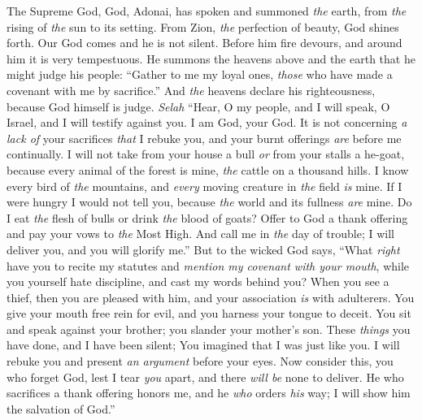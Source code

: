 \begin{biblechapter} %
 The Supreme God, God, Adonai, has spoken 
and summoned \textit{the} earth, 
from \textit{the} rising of \textit{the} sun 
to its setting.
\verse From Zion, \textit{the} perfection of beauty, 
God shines forth.
\verse Our God comes and he is not silent. 
Before him fire devours, 
and around him it is very tempestuous.
\verse He summons the heavens above 
and the earth that he might judge his people:
\verse “Gather to me my loyal ones, 
\textit{those} who have made a covenant with me by sacrifice.”
\verse And \textit{the} heavens declare his righteousness, 
because God himself is judge. \textit{Selah}
\verse “Hear, O my people, and I will speak, 
O Israel, and I will testify against you. 
I am God, your God.
\verse It is not concerning \textit{a lack of} your sacrifices \textit{that} I rebuke you, 
and your burnt offerings \textit{are} before me continually.
\verse I will not take from your house a bull 
\textit{or} from your stalls a he-goat,
\verse because every animal of the forest is mine, 
\textit{the} cattle on a thousand hills.
\verse I know every bird of \textit{the} mountains, 
and \textit{every} moving creature in \textit{the} field \textit{is} mine.
\verse If I were hungry I would not tell you, 
because \textit{the} world and its fullness \textit{are} mine.
\verse Do I eat \textit{the} flesh of bulls 
or drink \textit{the} blood of goats?
\verse Offer to God a thank offering 
and pay your vows to \textit{the} Most High.
\verse And call me in \textit{the} day of trouble; 
I will deliver you, and you will glorify me.”
\verse But to the wicked God says, 
“What \textit{right} have you to recite my statutes 
and \textit{mention my covenant with your mouth},
\verse while you yourself hate discipline, 
and cast my words behind you?
\verse When you see a thief, then you are pleased with him, 
and your association \textit{is} with adulterers.
\verse You give your mouth free rein for evil, 
and you harness your tongue to deceit.
\verse You sit and speak against your brother; 
you slander your mother’s son.
\verse These \textit{things} you have done, and I have been silent; 
You imagined that I was just like you. 
I will rebuke you and present \textit{an argument} before your eyes.
\verse Now consider this, you who forget God, 
lest I tear \textit{you} apart, and there \textit{will be} none to deliver.
\verse He who sacrifices a thank offering honors me, 
and he \textit{who} orders \textit{his} way; 
I will show him the salvation of God.”
\end{biblechapter}


